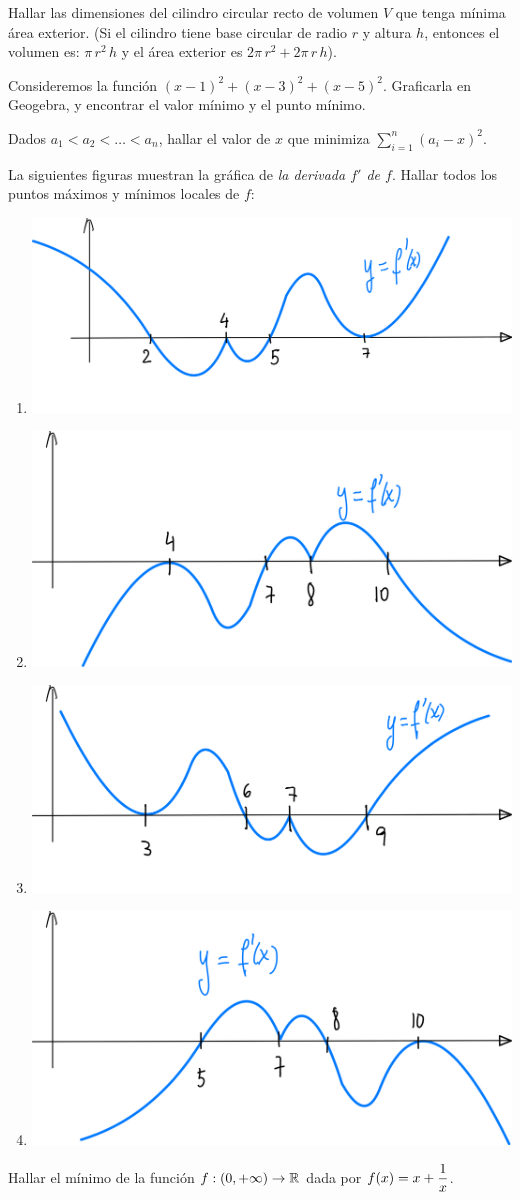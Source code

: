 \item Hallar las dimensiones del cilindro circular recto de volumen $V$ que tenga mínima área exterior. (Si el cilindro tiene base circular de radio $r$ y altura $h$, entonces el volumen es: $\pi \, r^2\, h$ y el área exterior es $2\pi \, r^2 + 2 \pi \, r\, h$).

\item Consideremos la función $(x-1)^2+(x-3)^2+(x-5)^2$. Graficarla en Geogebra, y encontrar el valor mínimo y el punto mínimo.

\item Dados $a_1<a_2<\dots <a_n$, hallar el valor de $x$ que minimiza $\sum_{i=1}^n (a_i-x)^2$.

\item La siguientes figuras muestran la gráfica de \emph{la derivada $f'$ de $f$}. Hallar todos los puntos máximos y mínimos locales de $f$:

\begin{multicols}{2}
  \begin{enumerate}
    \item \includegraphics[width=.4\textwidth]{pics/max-min-locales-ej-a.png}
    \item \includegraphics[width=.4\textwidth]{pics/max-min-locales-ej-b.png}
    \item \includegraphics[width=.4\textwidth]{pics/max-min-locales-ej-c.png}
    \item \includegraphics[width=.4\textwidth]{pics/max-min-locales-ej-d.png}
  \end{enumerate}
  
\end{multicols}

\item Hallar el mínimo de la función $f:(0,+\infty)\to \mathbb{R}$ dada por $\displaystyle f(x) = x + \frac1x$.